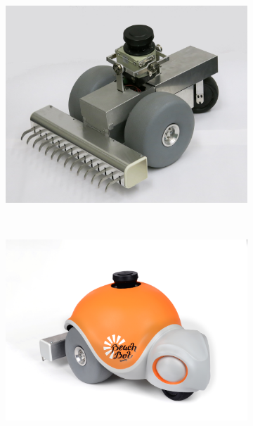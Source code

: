 \begin{figure}
\centering
\begin{subfigure}[c]{0.46\textwidth}
\includegraphics[width=\textwidth]{images/introduction/beachbot_back.jpg} 
\end{subfigure}
~
\begin{subfigure}[c]{0.46\textwidth}
\includegraphics[width=\textwidth]{images/introduction/final_shell.jpg} 
\end{subfigure}
\\
\vspace{2cm}
\begin{subfigure}[c]{0.46\textwidth}

\end{subfigure}
\end{figure}
